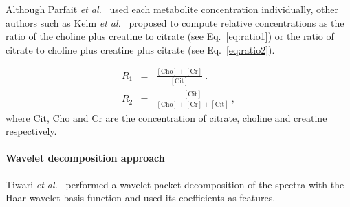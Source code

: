 Although Parfait \textit{et al.}~\cite{Parfait2012} used each metabolite concentration individually, other authors such as Kelm \textit{et al.}~\cite{Kelm2007} proposed to compute relative concentrations as the ratio of the choline plus creatine to citrate (see Eq.~\eqref{eq:ratio1}) or the ratio of citrate to choline plus creatine plus citrate (see Eq.~\eqref{eq:ratio2}).

\begin{eqnarray}
	R_1 & = & \frac{ [ \text{Cho} ] + [ \text{Cr} ]}{[ \text{Cit} ]} \ . \label{eq:ratio1} \\
	R_2 & = & \frac{[ \text{Cit} ]}{[\text{Cho}]+[\text{Cr}]+[\text{Cit}]} \ , \label{eq:ratio2}
\end{eqnarray}
\noindent where $\text{Cit}$, $\text{Cho}$ and $\text{Cr}$ are the concentration of citrate, choline and creatine respectively.

\paragraph{Wavelet decomposition approach} 
Tiwari \textit{et al.}~\cite{Tiwari2012} performed a wavelet packet decomposition \cite{Coifman1992} of the spectra with the Haar wavelet basis function and used its coefficients as features.
